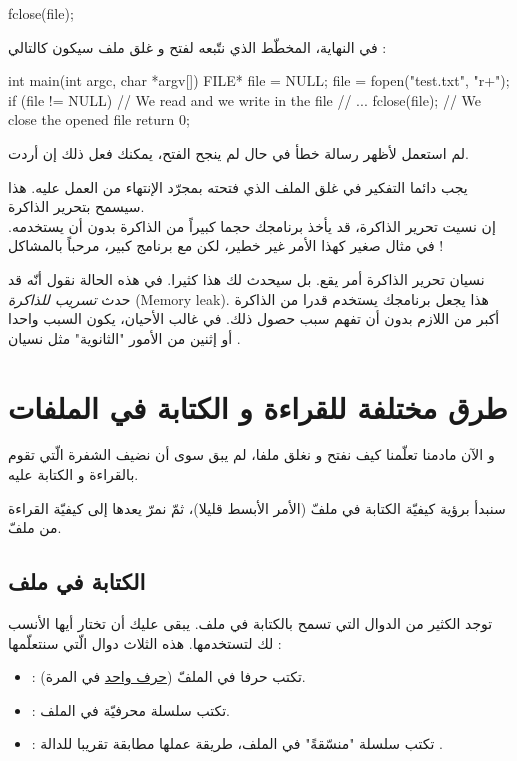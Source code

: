 \begin{Csource}
fclose(file);
\end{Csource}

في النهاية، المخطّط الذي نتّبعه لفتح و غلق ملف سيكون كالتالي :

\begin{Csource}
int main(int argc, char *argv[])
{
	FILE* file = NULL;
	file = fopen("test.txt", "r+");
	if (file != NULL)
	{
    		// We read and we write in the file
    		// ...
    		fclose(file); // We close the opened file
	}
	return 0;
}
\end{Csource}

لم استعمل
لأظهر رسالة خطأ في حال لم ينجح الفتح، يمكنك فعل ذلك إن أردت.

يجب دائما التفكير في غلق الملف الذي فتحته بمجرّد الإنتهاء من العمل عليه. هذا سيسمح بتحرير الذاكرة.\\
إن نسيت تحرير الذاكرة، قد يأخذ برنامجك حجما كبيراً من الذاكرة بدون أن يستخدمه. في مثال صغير كهذا الأمر غير خطير، لكن مع برنامج كبير، مرحباً بالمشاكل !

نسيان تحرير الذاكرة أمر يقع. بل سيحدث لك هذا كثيرا. في هذه الحالة نقول أنّه قد حدث
\textit{تسريب للذاكرة} (\textenglish{Memory leak}).
هذا يجعل برنامجك يستخدم قدرا من الذاكرة أكبر من اللازم بدون أن تفهم سبب حصول ذلك. في غالب الأحيان، يكون السبب واحدا أو إثنين من الأمور "الثانوية" مثل نسيان
.

\section{طرق مختلفة للقراءة و الكتابة في الملفات}

و الآن مادمنا تعلّمنا كيف نفتح و نغلق ملفا، لم يبق سوى أن نضيف الشفرة الّتي تقوم بالقراءة و الكتابة عليه.

سنبدأ برؤية كيفيّة الكتابة في ملفّ (الأمر الأبسط قليلا)، ثمّ نمرّ يعدها إلى كيفيّة القراءة من ملفّ.

\subsection{الكتابة في ملف}

توجد الكثير من الدوال التي تسمح بالكتابة في ملف. يبقى عليك أن تختار أيها الأنسب لك لتستخدمها.
هذه الثلاث دوال الّتي سنتعلّمها :

\begin{itemize}
  \item {} :
  تكتب حرفا في الملفّ
  (\underline{حرف واحد}
  في المرة).
  \item {} :
تكتب سلسلة محرفيّة في الملف.
  \item {} :
تكتب سلسلة "منسّقةً" في الملف، طريقة عملها مطابقة تقريبا للدالة
.
\end{itemize}

